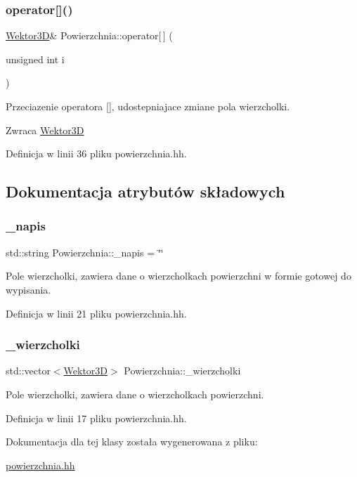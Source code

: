 \subsubsection{\texorpdfstring{operator[]()}{operator[]()}\hspace{0.1cm}{\footnotesize\ttfamily [2/2]}}
{\footnotesize\ttfamily \mbox{\hyperlink{class_wektor3_d}{Wektor3D}}\& Powierzchnia\+::operator\mbox{[}$\,$\mbox{]} (\begin{DoxyParamCaption}\item[{unsigned int}]{i }\end{DoxyParamCaption})\hspace{0.3cm}{\ttfamily [inline]}}

Przeciazenie operatora \mbox{[}\mbox{]}, udostepniajace zmiane pola wierzcholki.

\begin{DoxyReturn}{Zwraca}
\mbox{\hyperlink{class_wektor3_d}{Wektor3D}} 
\end{DoxyReturn}


Definicja w linii 36 pliku powierzchnia.\+hh.



\subsection{Dokumentacja atrybutów składowych}
\mbox{\label{class_powierzchnia_a6bedeffe3d73b7b54c4b1d33dc81b83a}} 
\subsubsection{\texorpdfstring{\_napis}{\_napis}}
{\footnotesize\ttfamily std\+::string Powierzchnia\+::\+\_\+napis = \char`\"{}\char`\"{}\hspace{0.3cm}{\ttfamily [protected]}}

Pole wierzcholki, zawiera dane o wierzcholkach powierzchni w formie gotowej do wypisania. 

Definicja w linii 21 pliku powierzchnia.\+hh.

\mbox{\label{class_powierzchnia_aab8cbab789010fa80e3b9c7d27669951}} 
\subsubsection{\texorpdfstring{\_wierzcholki}{\_wierzcholki}}
{\footnotesize\ttfamily std\+::vector$<$\mbox{\hyperlink{class_wektor3_d}{Wektor3D}}$>$ Powierzchnia\+::\+\_\+wierzcholki\hspace{0.3cm}{\ttfamily [protected]}}

Pole wierzcholki, zawiera dane o wierzcholkach powierzchni. 

Definicja w linii 17 pliku powierzchnia.\+hh.



Dokumentacja dla tej klasy została wygenerowana z pliku\+:\begin{DoxyCompactItemize}
\item 
\mbox{\hyperlink{powierzchnia_8hh}{powierzchnia.\+hh}}\end{DoxyCompactItemize}

